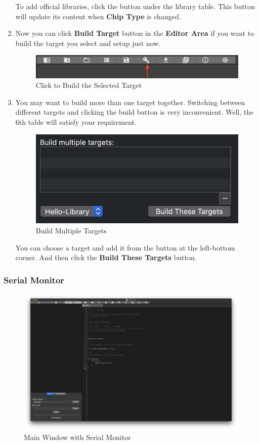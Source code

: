 \documentclass{article}
\begin{document}
\begin{enumerate}
					To add official libraries, click the button under the library table. This button will update its content when \textbf{Chip Type} is changed.
				\item Now you can click \textbf{Build Target} button in the \textbf{Editor Area} if you want to build the target you select and setup just now.
					\begin{figure}[h]
						\centering
						\includegraphics[width=.5\textwidth]{ToolBar-Build}
						\caption{Click to Build the Selected Target}
					\end{figure}
				
				\item You may want to build more than one target together. Switching between different targets and clicking the build button is very inconvenient. Well, the 6th table will satisfy your requirement.
					\begin{figure}[!h]
						\centering
						\includegraphics[width=.4\textwidth]{ProjectSetting-3}
						\caption{Build Multiple Targets}
					\end{figure}
					\newline
					You can choose a target and add it from the button at the left-bottom corner. And then click the \textbf{Build These Targets} button.
					
			\end{enumerate}
			
		\newpage
		\subsubsection{Serial Monitor}
		
			\begin{figure}[h]
				\centering
				\includegraphics[width=.65\textwidth]{MainWindow3}
				\caption{Main Window with Serial Monitor}
			\end{figure}
		
\end{document}
